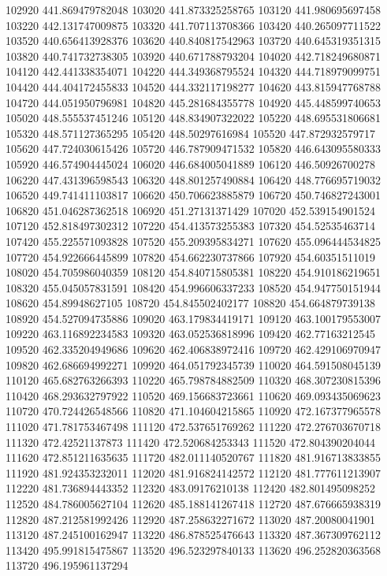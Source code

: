 {102920 441.869479782048
103020 441.873325258765
103120 441.980695697458
103220 442.131747009875
103320 441.707113708366
103420 440.265097711522
103520 440.656413928376
103620 440.840817542963
103720 440.645319351315
103820 440.741732738305
103920 440.671788793204
104020 442.718249680871
104120 442.441338354071
104220 444.349368795524
104320 444.718979099751
104420 444.404172455833
104520 444.332117198277
104620 443.815947768788
104720 444.051950796981
104820 445.281684355778
104920 445.448599740653
105020 448.555537451246
105120 448.834907322022
105220 448.695531806681
105320 448.571127365295
105420 448.50297616984
105520 447.872932579717
105620 447.724030615426
105720 446.787909471532
105820 446.643095580333
105920 446.574904445024
106020 446.684005041889
106120 446.50926700278
106220 447.431396598543
106320 448.801257490884
106420 448.776695719032
106520 449.741411103817
106620 450.706623885879
106720 450.746827243001
106820 451.046287362518
106920 451.27131371429
107020 452.539154901524
107120 452.818497302312
107220 454.413573255383
107320 454.52535463714
107420 455.225571093828
107520 455.209395834271
107620 455.096444534825
107720 454.922666445899
107820 454.662230737866
107920 454.60351511019
108020 454.705986040359
108120 454.840715805381
108220 454.910186219651
108320 455.045057831591
108420 454.996606337233
108520 454.947750151944
108620 454.89948627105
108720 454.845502402177
108820 454.664879739138
108920 454.527094735886
109020 463.179834419171
109120 463.100179553007
109220 463.116892234583
109320 463.052536818996
109420 462.77163212545
109520 462.335204949686
109620 462.406838972416
109720 462.429106970947
109820 462.686694992271
109920 464.051792345739
110020 464.591508045139
110120 465.682763266393
110220 465.798784882509
110320 468.307230815396
110420 468.293632797922
110520 469.156683723661
110620 469.093435069623
110720 470.724426548566
110820 471.104604215865
110920 472.167377965578
111020 471.781753467498
111120 472.537651769262
111220 472.276703670718
111320 472.42521137873
111420 472.520684253343
111520 472.804390204044
111620 472.851211635635
111720 482.011140520767
111820 481.916713833855
111920 481.924353232011
112020 481.916824142572
112120 481.777611213907
112220 481.736894443352
112320 483.09176210138
112420 482.801495098252
112520 484.786005627104
112620 485.188141267418
112720 487.676665938319
112820 487.212581992426
112920 487.258632271672
113020 487.20080041901
113120 487.245100162947
113220 486.878525476643
113320 487.367309762112
113420 495.991815475867
113520 496.523297840133
113620 496.252820363568
113720 496.195961137294
}
